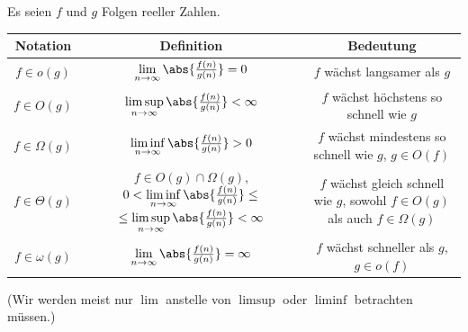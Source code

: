 \begin{questions}
	\clearpage
	\begin{center}
	Es seien $f$ und $g$ Folgen reeller Zahlen.\\
    \end{center}
	\vspace{0.5cm}
	\centering
	\small
	\begin{tabular}{|c|c|c|}
		\hline
		\textbf{Notation} & \textbf{Definition}                                              & \textbf{Bedeutung}                                  \\
		\hline
		$f \in o(g)$      & $\lim\limits_{n \to \infty} \abs{\frac{f(n)}{g(n)}} = 0$         & $f$ wächst langsamer als $g$                        \\
		\hline
		$f \in O(g)$      & $\limsup\limits_{n \to \infty} \abs{\frac{f(n)}{g(n)}} < \infty$ & $f$ wächst höchstens so schnell wie $g$             \\
		\hline
		$f \in \Omega(g)$ & $\liminf\limits_{n \to \infty} \abs{\frac{f(n)}{g(n)}} > 0$      & \makecell{$f$ wächst mindestens so schnell wie $g$, \\$g\in O(f)$}                          \\
		\hline
		$f \in \Theta(g)$ & \makecell{$f \in O(g)\cap \Omega(g)$,                                                                                  \\ $0 < \liminf\limits_{n \to \infty} \abs{\frac{f(n)}{g(n)}} \leq$ \\ $\leq\limsup\limits_{n \to \infty} \abs{\frac{f(n)}{g(n)}} < \infty$} & \makecell{$f$ wächst gleich schnell wie $g$,        \\sowohl $f\in O(g)$ als auch $f\in\Omega(g)$} \\
		\hline
		$f \in \omega(g)$ & $\lim\limits_{n \to \infty} \abs{\frac{f(n)}{g(n)}} = \infty$    & \makecell{$f$ wächst schneller als $g$,             \\$g\in o(f)$}                                      \\
		\hline
	\end{tabular}

	(Wir werden meist nur $\lim$ anstelle von $\limsup$ oder $\liminf$ betrachten müssen.)


\end{questions}